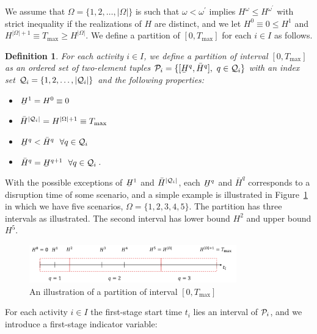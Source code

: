 \documentclass[11pt]{article}
\newtheorem{definition}{Definition}
\newcommand{\cQ}{{\cal Q}}
\newcommand{\noi}{\noindent}
\newcommand{\cP}{{\cal P}}
\renewcommand{\underbar}{\underaccent{\bar}}
\begin{document}
	\newline
	We assume that $\Omega = \{1,2,\ldots,|\Omega|\}$ is such that $\omega < \omega^\prime$ implies $H^\omega \le H^{\omega^\prime}$ with strict inequality if the realizations of $H$ are distinct, and we let $H^0 \equiv 0 \le H^1$ and $H^{|\Omega|+1} \equiv T_{\max} \ge H^{|\Omega|}$. We define a partition of $[0,T_{\max}]$ for each \(i \in I\) as follows.
	\begin{definition}\label{definition:partition}
		For each activity \(i \in I\), we define a partition of interval \([0,T_{\max}]\)  as an ordered set of two-element tuples  \(\cP_i = \{[\underbar{H}^q,\bar{H}^q],\ q \in \cQ_i\}\) with an index set \(\cQ_i=\{1,2,\ldots,|\cQ_i|\} \) and the following properties: 
		\begin{itemize}
			\item \(\underbar{H}^1 = H^0 \equiv 0\)
			\item \(\bar{H}^{|\cQ_i|} = H^{|\Omega| + 1} \equiv T_{\max}\)
			\item $\underbar{H}^q < \bar{H}^q  \ \ \forall q \in \cQ_i$
			\item \(\bar{H}^q = \underbar{H}^{q + 1} \  \ \forall q \in \cQ_i \).
		\end{itemize}
	\end{definition}
	\noi With the possible exceptions of $\underbar{H}^1$ and $\bar{H}^{|\cQ_i|}$, each \(\underbar{H}^q\) and \(\bar{H}^q\) corresponds to a disruption time of some scenario, and a simple example is illustrated in Figure~\ref{fig:simplePart} in which we have five scenarios, \(\Omega = \{1,2,3,4,5\}\). The partition has three intervals as illustrated. The second interval has lower bound \(H^2\) and upper bound \(H^5\).
	\begin{figure}[H]
		\centering
		\includegraphics[width=0.8\textwidth]{simplePart}
		\caption{An illustration of a partition of interval \([0,T_{\max}]\)}
		\label{fig:simplePart}
	\end{figure}
	\noi For each activity \(i \in I\) the first-stage start time \(t_i\) lies an interval of \(\cP_i\), and we introduce a first-stage indicator variable:
\end{document}
